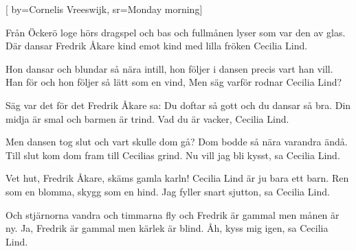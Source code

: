 


[ 	%
	by={Cornelis Vreeswijk},	%
	sr={Monday morning}]		%
	
\beginverse*		%
Från Öckerö loge hörs dragspel och bas
och fullmånen lyser som var den av glas.
Där dansar Fredrik Åkare kind emot kind
med lilla fröken Cecilia Lind.
\endverse			%

\beginverse*		%
Hon dansar och blundar så nära intill,
hon följer i dansen precis vart han vill.
Han för och hon följer så lätt som en vind,
Men säg varför rodnar Cecilia Lind?
\endverse			%

\beginverse*		%
Säg var det för det Fredrik Åkare sa:
Du doftar så gott och du dansar så bra.
Din midja är smal och barmen är trind.
Vad du är vacker, Cecilia Lind.
\endverse			%

\beginverse*		%
Men dansen tog slut och vart skulle dom gå?
Dom bodde så nära varandra ändå.
Till slut kom dom fram till Cecilias grind.
Nu vill jag bli kysst, sa Cecilia Lind.
\endverse			%

\beginverse*		%
Vet hut, Fredrik Åkare, skäms gamla karln!
Cecilia Lind är ju bara ett barn.
Ren som en blomma, skygg som en hind.
Jag fyller snart sjutton, sa Cecilia Lind.
\endverse			%

\beginverse*		%
Och stjärnorna vandra och timmarna fly
och Fredrik är gammal men månen är ny.
Ja, Fredrik är gammal men kärlek är blind.
Åh, kyss mig igen, sa Cecilia Lind.
\endverse			%
\endsong			%
